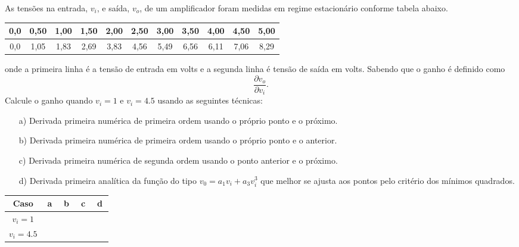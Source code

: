 \begin{exer} As tensões  na entrada, $v_i$, e saída, $v_o$, de um amplificador foram medidas em regime estacionário conforme tabela abaixo.
  \begin{center}
    \begin{tabular}{|c|c|c|c|c|c|c|c|c|c|c|}\hline
    0,0 &   0,50  &   1,00   &   1,50  &   2,00 &     2,50   &  3,00  &    3,50  &   4,00  &    4,50  &   5,00\\ \hline
    0,0  &  1,05  &  1,83  &  2,69  &  3,83 &   4,56 &   5,49 &   6,56  &  6,11 &   7,06  &  8,29\\ \hline 
    \end{tabular}
  \end{center}
onde  a primeira linha é a tensão de entrada em volts e a segunda linha é tensão de saída em volts.
Sabendo que o ganho é definido como \begin{equation} \frac{\partial v_o}{\partial v_i}. \end{equation} Calcule o ganho quando $v_i=1$ e $v_i=4.5$ usando as seguintes técnicas:
\begin{itemize}
\item[a)] Derivada primeira numérica de primeira ordem usando o próprio ponto e o próximo.
\item[b)] Derivada primeira numérica de primeira ordem usando o próprio ponto e o anterior.
\item[c)] Derivada primeira numérica de segunda ordem usando o ponto anterior e o próximo.
\item[d)] Derivada primeira analítica da função do tipo $v_0=a_1 v_i + a_3 v_i^3$ que melhor se ajusta aos pontos pelo critério dos mínimos quadrados.
\end{itemize}
\begin{center}
\begin{tabular}{|c|c|c|c|c|}\hline
 Caso &  a  &   b &   c   &   d \\ \hline
 $v_i=1$ &    & ~\hspace{50pt}~  &   & ~\hspace{50pt}~ \\ \hline
$v_i=4.5$ &~\hspace{50pt}~    &   &  ~\hspace{50pt}~   &\\ \hline
\end{tabular}
\end{center}
\end{exer}
